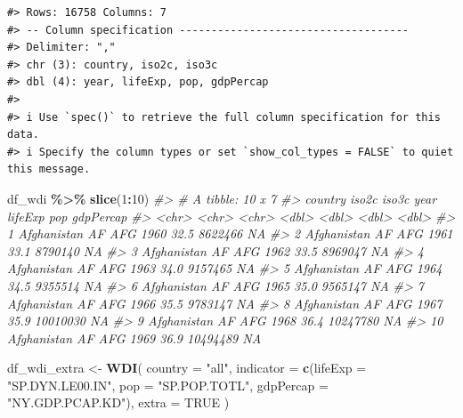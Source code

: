 \documentclass[
  xelatex, ja=standard]{bxjsbook}
\newenvironment{Shaded}{\begin{snugshade}}{\end{snugshade}}
\newcommand{\AttributeTok}[1]{\textcolor[rgb]{0.13,0.29,0.53}{#1}}
\newcommand{\CommentTok}[1]{\textcolor[rgb]{0.56,0.35,0.01}{\textit{#1}}}
\newcommand{\ConstantTok}[1]{\textcolor[rgb]{0.56,0.35,0.01}{#1}}
\newcommand{\DecValTok}[1]{\textcolor[rgb]{0.00,0.00,0.81}{#1}}
\newcommand{\FunctionTok}[1]{\textcolor[rgb]{0.13,0.29,0.53}{\textbf{#1}}}
\newcommand{\NormalTok}[1]{#1}
\newcommand{\OtherTok}[1]{\textcolor[rgb]{0.56,0.35,0.01}{#1}}
\newcommand{\SpecialCharTok}[1]{\textcolor[rgb]{0.81,0.36,0.00}{\textbf{#1}}}
\newcommand{\StringTok}[1]{\textcolor[rgb]{0.31,0.60,0.02}{#1}}
\theoremstyle{definition}
\theoremstyle{definition}
\theoremstyle{definition}
\theoremstyle{definition}
\theoremstyle{remark}
\begin{document}
\begin{verbatim}
#> Rows: 16758 Columns: 7
#> -- Column specification ------------------------------------
#> Delimiter: ","
#> chr (3): country, iso2c, iso3c
#> dbl (4): year, lifeExp, pop, gdpPercap
#> 
#> i Use `spec()` to retrieve the full column specification for this data.
#> i Specify the column types or set `show_col_types = FALSE` to quiet this message.
\end{verbatim}

\begin{Shaded}
\begin{Highlighting}[]
\NormalTok{df\_wdi }\SpecialCharTok{\%\textgreater{}\%} \FunctionTok{slice}\NormalTok{(}\DecValTok{1}\SpecialCharTok{:}\DecValTok{10}\NormalTok{)}
\CommentTok{\#\textgreater{} \# A tibble: 10 x 7}
\CommentTok{\#\textgreater{}    country     iso2c iso3c  year lifeExp      pop gdpPercap}
\CommentTok{\#\textgreater{}    \textless{}chr\textgreater{}       \textless{}chr\textgreater{} \textless{}chr\textgreater{} \textless{}dbl\textgreater{}   \textless{}dbl\textgreater{}    \textless{}dbl\textgreater{}     \textless{}dbl\textgreater{}}
\CommentTok{\#\textgreater{}  1 Afghanistan AF    AFG    1960    32.5  8622466        NA}
\CommentTok{\#\textgreater{}  2 Afghanistan AF    AFG    1961    33.1  8790140        NA}
\CommentTok{\#\textgreater{}  3 Afghanistan AF    AFG    1962    33.5  8969047        NA}
\CommentTok{\#\textgreater{}  4 Afghanistan AF    AFG    1963    34.0  9157465        NA}
\CommentTok{\#\textgreater{}  5 Afghanistan AF    AFG    1964    34.5  9355514        NA}
\CommentTok{\#\textgreater{}  6 Afghanistan AF    AFG    1965    35.0  9565147        NA}
\CommentTok{\#\textgreater{}  7 Afghanistan AF    AFG    1966    35.5  9783147        NA}
\CommentTok{\#\textgreater{}  8 Afghanistan AF    AFG    1967    35.9 10010030        NA}
\CommentTok{\#\textgreater{}  9 Afghanistan AF    AFG    1968    36.4 10247780        NA}
\CommentTok{\#\textgreater{} 10 Afghanistan AF    AFG    1969    36.9 10494489        NA}
\end{Highlighting}
\end{Shaded}

\begin{Shaded}
\begin{Highlighting}[]
\NormalTok{df\_wdi\_extra }\OtherTok{\textless{}{-}} \FunctionTok{WDI}\NormalTok{(}
  \AttributeTok{country =} \StringTok{"all"}\NormalTok{, }
  \AttributeTok{indicator =} \FunctionTok{c}\NormalTok{(}\AttributeTok{lifeExp =} \StringTok{"SP.DYN.LE00.IN"}\NormalTok{, }\AttributeTok{pop =} \StringTok{"SP.POP.TOTL"}\NormalTok{, }\AttributeTok{gdpPercap =} \StringTok{"NY.GDP.PCAP.KD"}\NormalTok{), }
  \AttributeTok{extra =} \ConstantTok{TRUE}
\NormalTok{)}
\end{Highlighting}
\end{Shaded}
\end{document}
